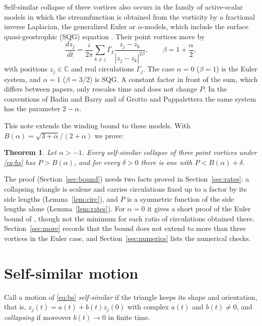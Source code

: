 \documentclass[11pt]{article}
\newtheorem{theorem}{Theorem}
\theoremstyle{definition}
\newcommand{\C}{\mathbb{C}}
\begin{document}
Self-similar collapse of three vortices also occurs in the family of active-scalar models in which the streamfunction is obtained from the vorticity by a fractional inverse Laplacian, the generalized Euler or $\alpha$-models, which include the surface quasi-geostrophic (SQG) equation \cite{bb2018,gp2025,reinaud2021,rds2022}. Their point vortices move by
\begin{equation}\label{eq:bs}
\frac{dz_j}{dt} = \frac{i}{2\pi} \sum_{k\ne j} \Gamma_k \frac{z_j - z_k}{|z_j - z_k|^{2\beta}}, \qquad \beta = 1 + \frac{\alpha}{2},
\end{equation}
with positions $z_j \in \C$ and real circulations $\Gamma_j$. The case $\alpha = 0$ ($\beta = 1$) is the Euler system, and $\alpha = 1$ ($\beta = 3/2$) is SQG. A constant factor in front of the sum, which differs between papers, only rescales time and does not change $P$. In the conventions of Badin and Barry \cite{bb2018} and of Grotto and Pappalettera \cite{gp2025} the same system has the parameter $2 - \alpha$.

This note extends the winding bound to these models. With $B(\alpha) = \sqrt{3+\alpha}/(2+\alpha)$ we prove:

\begin{theorem}\label{thm:main}
Let $\alpha > -1$. Every self-similar collapse of three point vortices under \eqref{eq:bs} has $P > B(\alpha)$, and for every $\delta > 0$ there is one with $P < B(\alpha) + \delta$.
\end{theorem}

The proof (Section~\ref{sec:bound}) needs two facts proved in Section~\ref{sec:rates}: a collapsing triangle is scalene and carries circulations fixed up to a factor by its side lengths (Lemma~\ref{lem:circ}), and $P$ is a symmetric function of the side lengths alone (Lemma~\ref{lem:rates}). For $\alpha = 0$ it gives a short proof of the Euler bound of \cite{hendrick2026}, though not the minimum for each ratio of circulations obtained there. Section~\ref{sec:more} records that the bound does not extend to more than three vortices in the Euler case, and Section~\ref{sec:numerics} lists the numerical checks.

\section{Self-similar motion}

Call a motion of \eqref{eq:bs} \emph{self-similar} if the triangle keeps its shape and orientation, that is, $z_j(t) = a(t) + b(t) z_j(0)$ with complex $a(t)$ and $b(t) \ne 0$, and \emph{collapsing} if moreover $b(t) \to 0$ in finite time.
\end{document}
